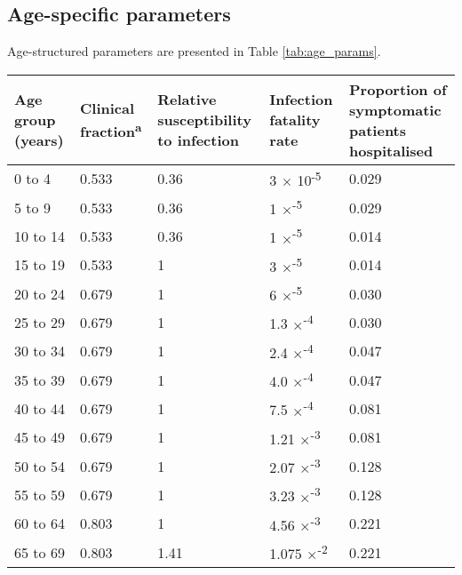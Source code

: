 \subsection{Age-specific parameters}

Age-structured parameters are presented in Table \ref{tab:age_params}.

\begin{table}[h]
    \begin{tabular}[h]{| p{2cm} | p{2.5cm} | p{3cm} | p{3cm} | p{2.5cm}|}
    \hline
        Age group (years) & 
        Clinical fraction\textsuperscript{a} & 
        Relative susceptibility to infection & 
        Infection fatality rate & 
        Proportion of symptomatic patients hospitalised \\
        \hline
        0 to 4 & 0.533 & 0.36 & 3 $\times$ 10\textsuperscript{-5} & 0.029 \\
        \hline
        5 to 9 & 0.533 & 0.36 & 1 $\times$\textsuperscript{-5} & 0.029 \\
        \hline
        10 to 14 & 0.533 & 0.36 & 1 $\times$\textsuperscript{-5} & 0.014 \\
        \hline
        15 to 19 & 0.533 & 1 & 3 $\times$\textsuperscript{-5} & 0.014 \\
        \hline
        20 to 24 & 0.679 & 1 & 6 $\times$\textsuperscript{-5} & 0.030 \\
        \hline
        25 to 29 & 0.679 & 1 & 1.3 $\times$\textsuperscript{-4} & 0.030 \\
        \hline
        30 to 34 & 0.679 & 1 & 2.4 $\times$\textsuperscript{-4} & 0.047 \\
        \hline
        35 to 39 & 0.679 & 1 & 4.0 $\times$\textsuperscript{-4} & 0.047 \\
        \hline
        40 to 44 & 0.679 & 1 & 7.5 $\times$\textsuperscript{-4} & 0.081 \\
        \hline
        45 to 49 & 0.679 & 1 & 1.21 $\times$\textsuperscript{-3} & 0.081 \\
        \hline
        50 to 54 & 0.679 & 1 & 2.07 $\times$\textsuperscript{-3} & 0.128 \\
        \hline
        55 to 59 & 0.679 & 1 & 3.23 $\times$\textsuperscript{-3} & 0.128 \\
        \hline
        60 to 64 & 0.803 & 1 & 4.56 $\times$\textsuperscript{-3} & 0.221 \\
        \hline
        65 to 69 & 0.803 & 1.41 & 1.075 $\times$\textsuperscript{-2} & 0.221 \\

\end{tabular}
\end{table}
